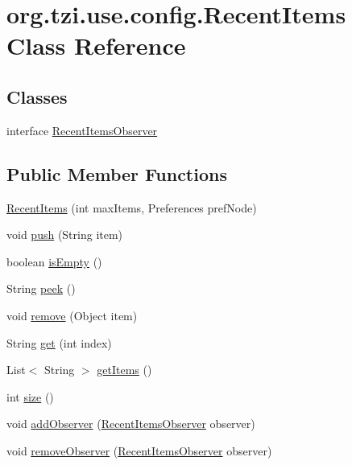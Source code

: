 \hypertarget{classorg_1_1tzi_1_1use_1_1config_1_1_recent_items}{\section{org.\-tzi.\-use.\-config.\-Recent\-Items Class Reference}
\label{classorg_1_1tzi_1_1use_1_1config_1_1_recent_items}
}
\subsection*{Classes}
\begin{DoxyCompactItemize}
\item 
interface \hyperlink{interfaceorg_1_1tzi_1_1use_1_1config_1_1_recent_items_1_1_recent_items_observer}{Recent\-Items\-Observer}
\end{DoxyCompactItemize}
\subsection*{Public Member Functions}
\begin{DoxyCompactItemize}
\item 
\hyperlink{classorg_1_1tzi_1_1use_1_1config_1_1_recent_items_a0242af278e7d37936dd65517ee5efec4}{Recent\-Items} (int max\-Items, Preferences pref\-Node)
\item 
void \hyperlink{classorg_1_1tzi_1_1use_1_1config_1_1_recent_items_a7f907e28b67fcd8a9592ce754d01e770}{push} (String item)
\item 
boolean \hyperlink{classorg_1_1tzi_1_1use_1_1config_1_1_recent_items_a5db90d86cd47aef985ac9bf577f543fc}{is\-Empty} ()
\item 
String \hyperlink{classorg_1_1tzi_1_1use_1_1config_1_1_recent_items_a06b23c3ade0263794483f270218c73cc}{peek} ()
\item 
void \hyperlink{classorg_1_1tzi_1_1use_1_1config_1_1_recent_items_a4adf680279ba4a11da75b95d3fc1cec0}{remove} (Object item)
\item 
String \hyperlink{classorg_1_1tzi_1_1use_1_1config_1_1_recent_items_ae2a450f401eea7a13a4062f205b7f92c}{get} (int index)
\item 
List$<$ String $>$ \hyperlink{classorg_1_1tzi_1_1use_1_1config_1_1_recent_items_a730603240a0ae3dadae9e0bc011b9344}{get\-Items} ()
\item 
int \hyperlink{classorg_1_1tzi_1_1use_1_1config_1_1_recent_items_a657b602ae27717ef2f6778e2f1095007}{size} ()
\item 
void \hyperlink{classorg_1_1tzi_1_1use_1_1config_1_1_recent_items_ae72434f6f41246895d61f0b074a7c8af}{add\-Observer} (\hyperlink{interfaceorg_1_1tzi_1_1use_1_1config_1_1_recent_items_1_1_recent_items_observer}{Recent\-Items\-Observer} observer)
\item 
void \hyperlink{classorg_1_1tzi_1_1use_1_1config_1_1_recent_items_ad670910b18e33d2ba8199ba78624b158}{remove\-Observer} (\hyperlink{interfaceorg_1_1tzi_1_1use_1_1config_1_1_recent_items_1_1_recent_items_observer}{Recent\-Items\-Observer} observer)
\end{DoxyCompactItemize}
